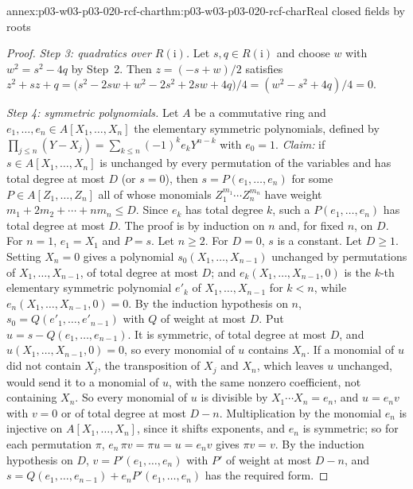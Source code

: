 \begin{annexitem}{annex:p03-w03-p03-020-rcf-char}{thm:p03-w03-p03-020-rcf-char}{Real closed fields by roots}
\begin{proof}
\emph{Step 3: quadratics over \(R(\mathrm i)\).} Let
\(s,q\in R(\mathrm i)\) and choose \(w\) with \(w^2=s^2-4q\) by Step~2.
Then \(z=(-s+w)/2\) satisfies
\(z^2+sz+q=\bigl(s^2-2sw+w^2-2s^2+2sw+4q\bigr)/4=(w^2-s^2+4q)/4=0\).

\emph{Step 4: symmetric polynomials.} Let \(A\) be a commutative ring and
\(e_1,\ldots,e_n\in A[X_1,\ldots,X_n]\) the elementary symmetric
polynomials, defined by
\(\prod_{j\le n}(Y-X_j)=\sum_{k\le n}(-1)^ke_kY^{n-k}\) with \(e_0=1\).
\emph{Claim:} if \(s\in A[X_1,\ldots,X_n]\) is unchanged by every
permutation of the variables and has total degree at most \(D\) (or
\(s=0\)), then \(s=P(e_1,\ldots,e_n)\) for some
\(P\in A[Z_1,\ldots,Z_n]\) all of whose monomials
\(Z_1^{m_1}\cdots Z_n^{m_n}\) have weight \(m_1+2m_2+\cdots+nm_n\le D\).
Since \(e_k\) has total degree \(k\), such a \(P(e_1,\ldots,e_n)\) has total
degree at most \(D\). The proof is by induction on \(n\) and, for fixed
\(n\), on \(D\). For \(n=1\), \(e_1=X_1\) and \(P=s\). Let \(n\ge2\). For
\(D=0\), \(s\) is a constant. Let \(D\ge1\). Setting \(X_n=0\) gives a
polynomial \(s_0(X_1,\ldots,X_{n-1})\) unchanged by permutations of
\(X_1,\ldots,X_{n-1}\), of total degree at most \(D\); and
\(e_k(X_1,\ldots,X_{n-1},0)\) is the \(k\)-th elementary symmetric
polynomial \(e'_k\) of \(X_1,\ldots,X_{n-1}\) for \(k<n\), while
\(e_n(X_1,\ldots,X_{n-1},0)=0\). By the induction hypothesis on \(n\),
\(s_0=Q(e'_1,\ldots,e'_{n-1})\) with \(Q\) of weight at most \(D\). Put
\(u=s-Q(e_1,\ldots,e_{n-1})\). It is symmetric, of total degree at most
\(D\), and \(u(X_1,\ldots,X_{n-1},0)=0\), so every monomial of \(u\)
contains \(X_n\). If a monomial of \(u\) did not contain \(X_j\), the
transposition of \(X_j\) and \(X_n\), which leaves \(u\) unchanged, would
send it to a monomial of \(u\), with the same nonzero coefficient, not
containing \(X_n\). So every monomial of \(u\) is divisible by
\(X_1\cdots X_n=e_n\), and \(u=e_nv\) with \(v=0\) or of total degree at
most \(D-n\). Multiplication by the monomial \(e_n\) is injective on
\(A[X_1,\ldots,X_n]\), since it shifts exponents, and \(e_n\) is symmetric;
so for each permutation \(\pi\), \(e_n\,\pi v=\pi u=u=e_nv\) gives
\(\pi v=v\). By the induction hypothesis on \(D\),
\(v=P'(e_1,\ldots,e_n)\) with \(P'\) of weight at most \(D-n\), and
\(s=Q(e_1,\ldots,e_{n-1})+e_nP'(e_1,\ldots,e_n)\) has the required form.


\end{proof}
\end{annexitem}
